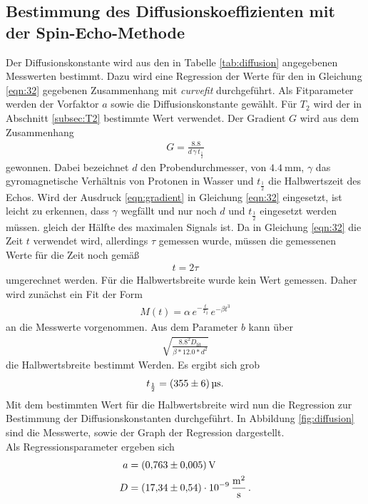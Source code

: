 \subsection{Bestimmung des Diffusionskoeffizienten mit der Spin-Echo-Methode}
\label{subsec:D}
Der Diffusionskonstante wird aus den in Tabelle \ref{tab:diffusion} angegebenen
Messwerten bestimmt.
Dazu wird eine Regression der Werte für den in Gleichung \eqref{eqn:32} gegebenen Zusammenhang mit
\textit{curvefit} durchgeführt.
Als Fitparameter werden der Vorfaktor $a$ sowie die Diffusionskonstante gewählt. Für $T_{2}$ wird der in Abschnitt
\ref{subsec:T2} bestimmte Wert verwendet. Der Gradient $G$ wird aus dem Zusammenhang
\begin{align}
  \label{eqn:gradient}
  G = \frac{8.8}{d \, \gamma \, t_{\frac{1}{2}}}
\end{align}
gewonnen. Dabei bezeichnet $d$ den Probendurchmesser, von $\SI{4.4}{\milli\meter}$, $\gamma$ das gyromagnetische Verhältnis
von Protonen in Wasser und $t_{\frac{1}{2}}$ die Halbwertszeit des Echos.
Wird der Ausdruck \eqref{eqn:gradient} in Gleichung \eqref{eqn:32} eingesetzt, ist leicht zu erkennen, dass $\gamma$ wegfällt und nur noch $d$ und $t_{\frac{1}{2}}$ eingesetzt werden müssen.
gleich der Hälfte des maximalen Signals ist.
Da in Gleichung \eqref{eqn:32} die Zeit $t$ verwendet wird, allerdings $\tau$ gemessen wurde, müssen
die gemessenen Werte für die Zeit noch gemäß
\begin{align}
  t = 2 \tau
\end{align}
umgerechnet werden.
Für die Halbwertsbreite wurde kein Wert gemessen.
Daher wird zunächst ein Fit der Form
\begin{align}
  M(t) = \alpha \, e^{-\frac{t}{T_{2}}} \, e^{-\beta t^{3}}
\end{align}
an die Messwerte vorgenommen.
Aus dem Parameter $b$ kann über
\begin{align}
  \sqrt{\frac{8.8^{2}  D_{\text{lit}}} {\beta  * 12.0 * d^{2} } }
\end{align}
die Halbwertsbreite bestimmt Werden.
Es ergibt sich grob
\begin{align*}
  t_{\frac{1}{2}} = \SI{355+-6}{\micro\second}.
\end{align*}
Mit dem bestimmten Wert für die Halbwertsbreite wird nun die Regression zur Bestimmung der Diffusionskonstanten durchgeführt.
In Abbildung \ref{fig:diffusion} sind die Messwerte, sowie der Graph der Regression dargestellt.\\
Als Regressionsparameter ergeben sich
\begin{align*}
  a &= \SI{0.763+-0.005}{\volt}\\
  D &= \SI{17.34+-0.54 e-9}{\meter\squared\per\second} \, .
\end{align*}

